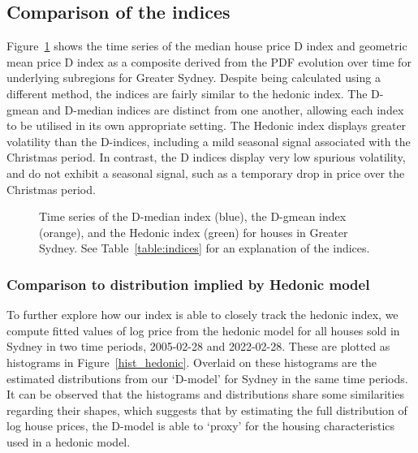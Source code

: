 \subsection{Comparison of the indices}

Figure~\ref{graph_major_city_hedonic} shows the time series of the median house price D index and geometric mean price D index as a composite derived from the PDF evolution over time for underlying subregions for Greater Sydney. Despite being calculated using a different method, the indices are fairly similar to the hedonic index. The D-gmean and D-median indices are distinct from one another, allowing each index to be utilised in its own appropriate setting.  The Hedonic index displays greater volatility than the D-indices, including a mild seasonal signal associated with the Christmas period. In contrast, the D indices display very low spurious volatility, and do not exhibit a seasonal signal, such as a temporary drop in price over the Christmas period. 

\begin{figure}[H]
	\begin{center}
	\end{center}
	\caption{  Time series of the D-median index (blue), the D-gmean index (orange), and the Hedonic index (green) for houses in Greater Sydney. See Table~\ref{table:indices} for an explanation of the indices.}
	\label{graph_major_city_hedonic}
\end{figure}

\subsubsection{Comparison to distribution implied by Hedonic model}

To further explore how our index is able to closely track the hedonic index, we compute fitted values of log price from the hedonic model for all houses sold in Sydney in two time periods, 2005-02-28 and 2022-02-28. These are plotted as histograms in Figure~\ref{hist_hedonic}. Overlaid on these histograms are the estimated distributions from our `D-model' for Sydney in the same time periods. It can be observed that the histograms and distributions share some similarities regarding their shapes, which suggests that by estimating the full distribution of log house prices, the D-model is able to `proxy' for the housing characteristics used in a hedonic model. 


